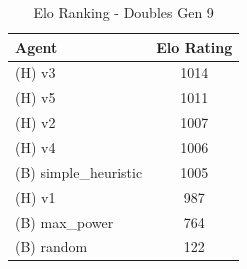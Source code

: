 \begin{table}[htbp]
\caption{Elo Ranking - Doubles Gen 9}
\label{tab:elo_doubles_gen_9}
\begin{tabular}{lc}
\toprule
Agent & Elo Rating \\
\midrule
(H) v3 & 1014 \\
(H) v5 & 1011 \\
(H) v2 & 1007 \\
(H) v4 & 1006 \\
(B) simple\_heuristic & 1005 \\
(H) v1 & 987 \\
(B) max\_power & 764 \\
(B) random & 122 \\
\bottomrule
\end{tabular}
\end{table}
